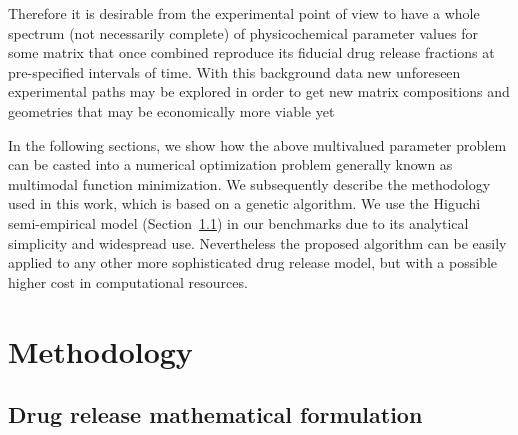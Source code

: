 \documentclass[superbib,unsortedaddress,preprint,byrevtex,aps,noshowpacs,titlepage]{revtex4}
\begin{document}
Therefore it is desirable from the experimental point of view to have a whole spectrum 
(not necessarily complete) of physicochemical parameter values for some matrix that once combined 
reproduce its fiducial drug release fractions at pre-specified intervals of time.
With this background data new unforeseen experimental paths may be explored in order to get new matrix
compositions and geometries that may be economically more viable yet 

In the following sections, we show how the above multivalued parameter problem can
be casted into a numerical optimization problem generally known as multimodal function 
minimization.
We subsequently describe the methodology used in this work, which is based on a genetic algorithm.
We use the Higuchi semi-empirical model (Section~\ref{sec:higuchi}) in
our benchmarks due to its analytical simplicity and widespread use.
Nevertheless the proposed algorithm can be easily applied to any other more sophisticated
drug release model, but with a possible higher cost in computational resources. 

\section{Methodology}

\subsection{Drug release mathematical formulation}
\label{sec:higuchi}
\end{document}
